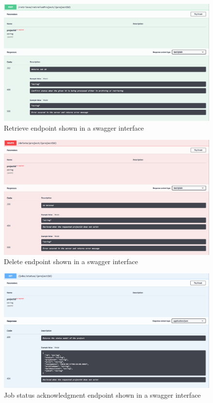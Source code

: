    \begin{figure}[H]
        \centering \includegraphics[scale=0.3]{grafiken/retrieveSwagger.png}
        \caption{Retrieve endpoint shown in a swagger interface}
        \label{fig:retrieveSwagger}
    \end{figure}

    \begin{figure}[H]
        \centering \includegraphics[scale=0.3]{grafiken/deleteSwagger.png}
        \caption{Delete endpoint shown in a swagger interface}
        \label{fig:deleteSwagger}
    \end{figure}
    
    \begin{figure}[H]
        \centering \includegraphics[scale=0.3]{grafiken/jobSwagger.png}
        \caption{Job status acknowledgment endpoint shown in a swagger interface}
        \label{fig:jobSwagger}
    \end{figure}

